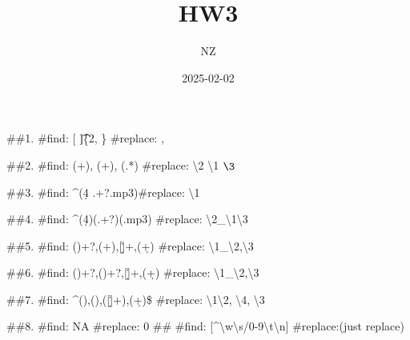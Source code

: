 \documentclass[
]{article}
\title{HW3}
\author{NZ}
\date{2025-02-02}
\begin{document}
\maketitle

\#\#1. \#find: {[} \t]\{2, \} \#replace: ,

\#\#2. \#find: (\w+), (\w+), (.*) \#replace: \textbackslash2
\textbackslash1 \(\3\)

\#\#3. \#find: \^{}\s*(\d{4} .+?.mp3)\s* \#replace: \textbackslash1\n

\#\#4. \#find: \^{}\s*(\d{4})\s(.+?)(.mp3) \#replace:
\textbackslash2\_\textbackslash1\textbackslash3

\#\#5. \#find: (\w)\w+?,(\w+),{[}\d\.]+,(\d+) \#replace:
\textbackslash1\_\textbackslash2,\textbackslash3

\#\#6. \#find: (\w)\w+?,()\w+?,{[}\d\.]+,(\d+) \#replace:
\textbackslash1\_\textbackslash2,\textbackslash3

\#\#7. \#find: \^{}()\w*,()\w*,({[}\d\.]+),(\d+)\$ \#replace:
\textbackslash1\textbackslash2, \textbackslash4, \textbackslash3

\#\#8. \#find: NA \#replace: 0 \#\# \#find:
{[}\^{}\textbackslash w\textbackslash s/0-9\textbackslash t\textbackslash n{]}
\#replace:(just replace)
\end{document}
